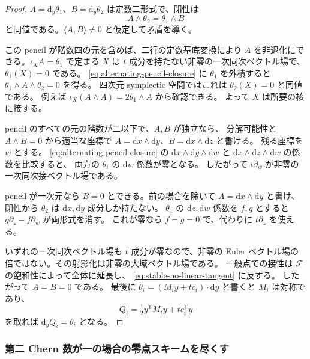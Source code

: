 \begin{proof}
$A=\mathrm{d}_y\theta_1$、$B=\mathrm{d}_y\theta_2$ は定数二形式で、閉性は
\begin{equation}
 A\wedge\theta_2=\theta_1\wedge B
 \label{eq:alternating-pencil-closure}
\end{equation}
と同値である。$\langle A,B\rangle\neq0$ と仮定して矛盾を導く。

この pencil が階数四の元を含めば、二行の定数基底変換により
$A$ を非退化にできる。$\iota_XA=\theta_1$ で定まる $X$ は
$t$ 成分を持たない非零の一次同次ベクトル場で、
$\theta_1(X)=0$ である。
\eqref{eq:alternating-pencil-closure} に $\theta_1$ を外積すると
$\theta_1\wedge A\wedge\theta_2=0$ を得る。
四次元 symplectic 空間ではこれは $\theta_2(X)=0$ と同値である。
例えば $\iota_X(A\wedge A)=2\theta_1\wedge A$ から確認できる。
よって $X$ は所要の核に接する。

pencil のすべての元の階数が二以下で、$A,B$ が独立なら、
分解可能性と $A\wedge B=0$ から適当な座標で
$A=\mathrm{d} x\wedge\mathrm{d} y$、$B=\mathrm{d} x\wedge\mathrm{d} z$ と書ける。
残る座標を $w$ とする。
\eqref{eq:alternating-pencil-closure} の
$\mathrm{d} x\wedge\mathrm{d} y\wedge\mathrm{d} w$ と
$\mathrm{d} x\wedge\mathrm{d} z\wedge\mathrm{d} w$ の係数を比較すると、
両方の $\theta_i$ の $\mathrm{d} w$ 係数が零となる。
したがって $t\partial_w$ が非零の一次同次接ベクトル場である。

pencil が一次元なら $B=0$ とできる。前の場合を除いて
$A=\mathrm{d} x\wedge\mathrm{d} y$ と書け、閉性から $\theta_2$ は
$\mathrm{d} x,\mathrm{d} y$ 成分しか持たない。
$\theta_1$ の $\mathrm{d} z,\mathrm{d} w$ 係数を $f,g$ とすると
$g\partial_z-f\partial_w$ が両形式を消す。
これが零なら $f=g=0$ で、代わりに $t\partial_z$ を使える。

いずれの一次同次ベクトル場も $t$ 成分が零なので、非零の Euler
ベクトル場の倍ではない。その射影化は非零の大域ベクトル場である。
一般点での接性は $\mathcal F$ の飽和性によって全体に延長し、
\eqref{eq:stable-no-linear-tangent} に反する。
したがって $A=B=0$ である。
最後に $\theta_i=(M_i y+t c_i)\cdot\mathrm{d} y$ と書くと $M_i$ は対称であり、
\[
 Q_i=\tfrac12 y^{\mathsf T}M_i y+t c_i^{\mathsf T}y
\]
を取れば $\mathrm{d}_yQ_i=\theta_i$ となる。
\end{proof}

\subsubsection{第二 Chern 数が一の場合の零点スキームを尽くす}

